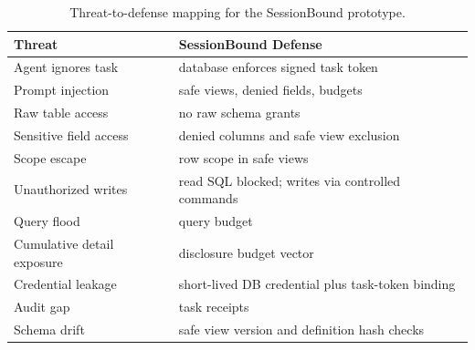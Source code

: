 \documentclass[10pt,twocolumn]{article}
\begin{document}
\begin{table}[p]
\centering
\small
\setlength{\tabcolsep}{3pt}
\caption{Threat-to-defense mapping for the SessionBound prototype.}
\label{tab:threat-defense}
\begin{tabular}{@{}
  >{\raggedright\arraybackslash}p{}
  >{\raggedright\arraybackslash}p{}@{}}
\toprule
Threat & SessionBound Defense \\
\midrule
Agent ignores task & database enforces signed task token \\
Prompt injection & safe views, denied fields, budgets \\
Raw table access & no raw schema grants \\
Sensitive field access & denied columns and safe view exclusion \\
Scope escape & row scope in safe views \\
Unauthorized writes & read SQL blocked; writes via controlled
commands \\
Query flood & query budget \\
Cumulative detail exposure & disclosure budget vector \\
Credential leakage & short-lived DB credential plus task-token
binding \\
Audit gap & task receipts \\
Schema drift & safe view version and definition hash checks \\
\bottomrule
\end{tabular}
\end{table}

\clearpage

\onecolumn


\end{document}
